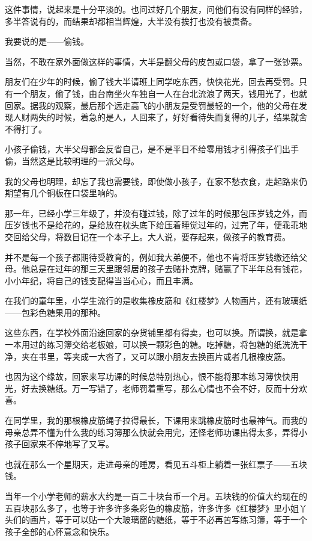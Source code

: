 \par 这件事情，说起来是十分平淡的。也问过好几个朋友，问他们有没有同样的经验，多半答说有的，而结果却都相当辉煌，大半没有挨打也没有被责备。
\par 我要说的是——偷钱。
\par 当然，不敢在家外面做这样的事情，大半是翻父母的皮包或口袋，拿了一张钞票。
\par 朋友们在少年的时候，偷了钱大半请班上同学吃东西，快快花光，回去再受罚。只有一个朋友，偷了钱，由台南坐火车独自一人在台北流浪了两天，钱用光了，也就回家。据我的观察，最后那个远走高飞的小朋友是受罚最轻的一个，他的父母在发现人财两失的时候，着急的是人，人回来了，好好看待失而复得的儿子，结果就舍不得打了。
\par 小孩子偷钱，大半父母都会反省自己，是不是平日不给零用钱才引得孩子们出手偷，当然这是比较明理的一派父母。
\par 我的父母也明理，却忘了我也需要钱，即使做小孩子，在家不愁衣食，走起路来仍期望有几个铜板在口袋里响的。
\par 那一年，已经小学三年级了，并没有碰过钱，除了过年的时候那包压岁钱之外，而压岁钱也不是给花的，是给放在枕头底下给压着睡觉过年的，过完了年，便乖乖地交回给父母，将数目记在一个本子上。大人说，要存起来，做孩子的教育费。
\par 并不是每一个孩子都期待受教育的，例如我大弟便不，他也不肯将压岁钱缴还给父母。他总是在过年的那三天里跟邻居的孩子去赌扑克牌，赌赢了下半年总有钱花，小小年纪，将自己的钱支配得当当心心，而且丰满。
\par 在我们的童年里，小学生流行的是收集橡皮筋和《红楼梦》人物画片，还有玻璃纸——包彩色糖果用的那种。
\par 这些东西，在学校外面沿途回家的杂货铺里都有得卖，也可以换。所谓换，就是拿一本用过的练习簿交给老板娘，可以换一颗彩色的糖。吃掉糖，将包糖的纸洗洗干净，夹在书里，等夹成一大沓了，又可以跟小朋友去换画片或者几根橡皮筋。
\par 也因为这个缘故，回家来写功课的时候总特别热心，恨不能将那本练习簿快快用光，好去换糖纸。万一写错了，老师罚着重写，那么心情也不会不好，反而十分欢喜。
\par 在同学里，我的那根橡皮筋绳子拉得最长，下课用来跳橡皮筋时也最神气。而我的母亲总弄不懂为什么我的练习簿那么快就会用完，还怪老师功课出得太多，弄得小孩子回家来不停地写了又写。
\par 也就在那么一个星期天，走进母亲的睡房，看见五斗柜上躺着一张红票子——五块钱。
\par 当年一个小学老师的薪水大约是一百二十块台币一个月。五块钱的价值大约现在的五百块那么多了，也等于许多许多条彩色的橡皮筋，许多许多《红楼梦》里小姐丫头们的画片，等于可以贴一个大玻璃窗的糖纸，等于不必再苦写练习簿，等于一个孩子全部的心怀意念和快乐。
